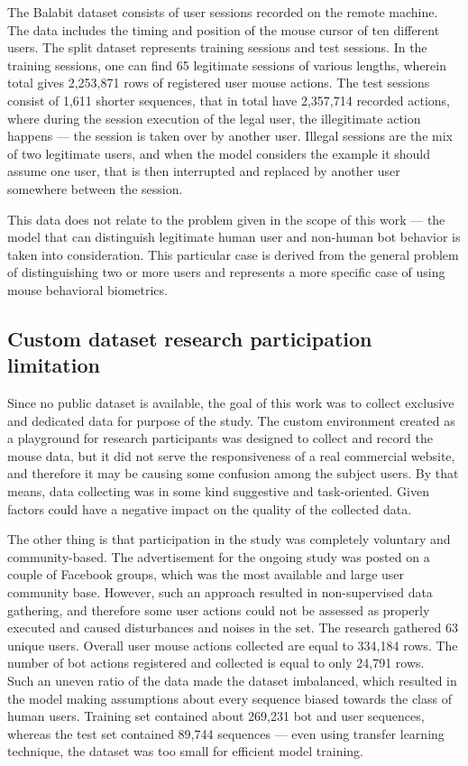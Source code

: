 The Balabit dataset consists of user sessions recorded on the remote machine.
The data includes the timing and position of the mouse cursor of ten different users.
The split dataset represents training sessions and test sessions.
In the training sessions, one can find 65 legitimate sessions of various lengths, wherein total gives 2,253,871 rows of registered user mouse actions.
The test sessions consist of 1,611 shorter sequences, that in total have 2,357,714 recorded actions, where during the session execution of the legal user, the illegitimate action happens --- the session is taken over by another user.
Illegal sessions are the mix of two legitimate users, and when the model considers the example it should assume one user, that is then interrupted and replaced by another user somewhere between the session.

This data does not relate to the problem given in the scope of this work --- the model that can distinguish legitimate human user and non-human bot behavior is taken into consideration.
This particular case is derived from the general problem of distinguishing two or more users and represents a more specific case of using mouse behavioral biometrics.

\subsection{Custom dataset research participation limitation}\label{subsec:custom-dataset-research}
Since no public dataset is available, the goal of this work was to collect exclusive and dedicated data for purpose of the study.
The custom environment created as a playground for research participants was designed to collect and record the mouse data, but it did not serve the responsiveness of a real commercial website, and therefore it may be causing some confusion among the subject users.
By that means, data collecting was in some kind suggestive and task-oriented.
Given factors could have a negative impact on the quality of the collected data.

The other thing is that participation in the study was completely voluntary and community-based.
The advertisement for the ongoing study was posted on a couple of Facebook groups, which was the most available and large user community base.
However, such an approach resulted in non-supervised data gathering, and therefore some user actions could not be assessed as properly executed and caused disturbances and noises in the set.
The research gathered 63 unique users.
Overall user mouse actions collected are equal to 334,184 rows.
The number of bot actions registered and collected is equal to only 24,791 rows.\\
Such an uneven ratio of the data made the dataset imbalanced, which resulted in the model making assumptions about every sequence biased towards the class of human users.
Training set contained about 269,231 bot and user sequences, whereas the test set contained 89,744 sequences --- even using transfer learning technique, the dataset was too small for efficient model training.

